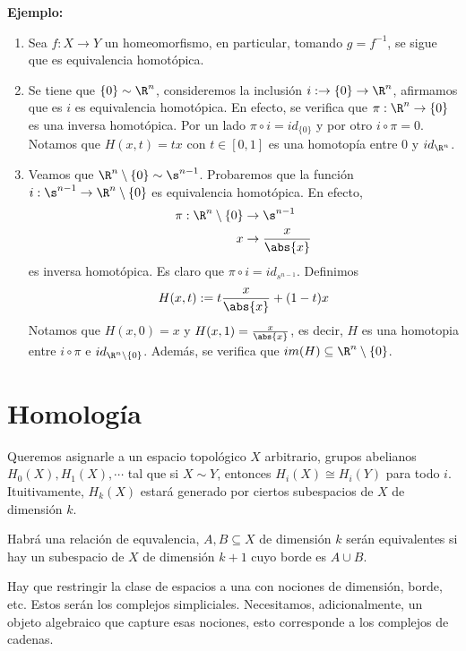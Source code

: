 \documentclass{article}
\begin{document}
\vspace{2mm}
\noindent\textbf{Ejemplo:}
\begin{enumerate}
    \item Sea $f:X\to Y$ un homeomorfismo, en particular, tomando $g=f^{-1}$, se sigue que es 
    equivalencia homotópica.

    \item Se tiene que $\{0\}\sim\R^{n}$, consideremos la inclusión $i:\to\{0\}\to\R^{n}$, 
    afirmamos que es $i$ es equivalencia homotópica. En efecto, se verifica que $\pi:\R^{n}\to
    \{0\}$ es una inversa homotópica. Por un lado $\pi\circ i=id_{\{0\}}$ y por otro 
    $i\circ\pi=0$. Notamos que $H(x,t)=tx$ con $t\in[0,1]$ es una homotopía entre $0$ y 
    $id_{\R^{n}}$.

    \item Veamos que $\R^{n}\setminus\{0\}\sim\s^{n-1}$. Probaremos que la función 
    $i:\s^{n-1}\to\R^{n}\setminus\{0\}$ es equivalencia homotópica. En efecto,
    \begin{align*}
        \pi:\R^{n}\setminus\{0\} &\to \s^{n-1} \\
        x &\to \frac{x}{\abs{x}}
    \end{align*}
    es inversa homotópica. Es claro que $\pi\circ i=id_{s^{n-1}}$. Definimos
    \begin{equation*}
        H(x,t):=t\frac{x}{\abs{x}}+(1-t)x
    \end{equation*}
    Notamos que $H(x,0)=x$ y $H(x,1)=\frac{x}{\abs{x}}$, es decir, $H$ es una homotopia entre 
    $i\circ\pi$ e $id_{\R^{n}\setminus\{0\}}$. Además, se verifica que 
    $im(H)\subseteq\R^{n}\setminus\{0\}$.
\end{enumerate}

\newpage
\section{Homología}
\noindent Queremos asignarle a un espacio topológico $X$ arbitrario, grupos abelianos 
$H_{0}(X),H_{1}(X),\cdots$ tal que si $X\sim Y$, entonces $H_{i}(X)\cong H_{i}(Y)$ para todo $i$.
Ituitivamente, $H_{k}(X)$ estará generado por ciertos subespacios de $X$ de dimensión $k$.

\vspace{2mm}
\noindent Habrá una relación de equvalencia, $A,B\subseteq X$ de dimensión $k$ serán equivalentes
si hay un subespacio de $X$ de dimensión $k+1$ cuyo borde es $A\cup B$.

\vspace{2mm}
\noindent Hay que restringir la clase de espacios a una con nociones de dimensión, borde, etc. 
Estos serán los complejos simpliciales. Necesitamos, adicionalmente, un objeto algebraico que 
capture esas nociones, esto corresponde a los complejos de cadenas.
\end{document}

